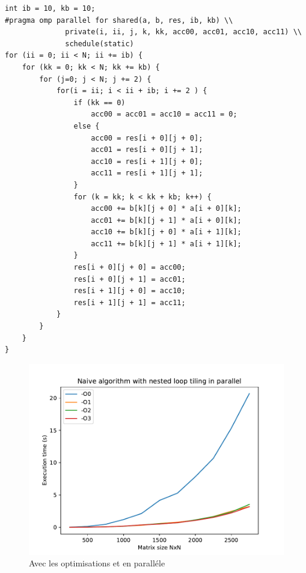 \documentclass {article}
\begin{document}
\begin{lstlisting}
int ib = 10, kb = 10;
#pragma omp parallel for shared(a, b, res, ib, kb) \\
              private(i, ii, j, k, kk, acc00, acc01, acc10, acc11) \\
              schedule(static)
for (ii = 0; ii < N; ii += ib) {
    for (kk = 0; kk < N; kk += kb) {
        for (j=0; j < N; j += 2) {
            for(i = ii; i < ii + ib; i += 2 ) {
                if (kk == 0)
                    acc00 = acc01 = acc10 = acc11 = 0;
                else {
                    acc00 = res[i + 0][j + 0];
                    acc01 = res[i + 0][j + 1];
                    acc10 = res[i + 1][j + 0];
                    acc11 = res[i + 1][j + 1];
                }
                for (k = kk; k < kk + kb; k++) {
                    acc00 += b[k][j + 0] * a[i + 0][k];
                    acc01 += b[k][j + 1] * a[i + 0][k];
                    acc10 += b[k][j + 0] * a[i + 1][k];
                    acc11 += b[k][j + 1] * a[i + 1][k];
                }
                res[i + 0][j + 0] = acc00;
                res[i + 0][j + 1] = acc01;
                res[i + 1][j + 0] = acc10;
                res[i + 1][j + 1] = acc11;
            }
        }
    }
}
\end{lstlisting}

\begin{figure}[H]
    \includegraphics[width=\linewidth]{plot/with_opt+parallel.pdf}
    \caption{Avec les optimisations et en paralléle}
    \label{fig:with_opt+parallel}
\end{figure}
\end{document}
